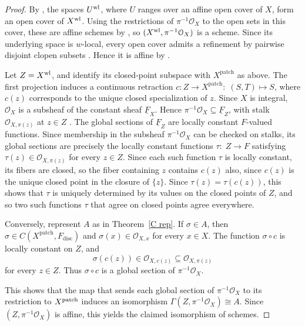 \documentclass[11pt]{amsart}
\def\O{{\mathcal{O}}}
\begin{document}
\begin{proof}
By \cite[Lemma~7.14]{ScholzeDiamonds}, the spaces $U^{\rm wl}$, where $U$ ranges over an affine open cover of $X$, form an open cover of $X^{\rm wl}$. Using the  restrictions of $\pi^{-1}\mathcal O_X$ to the open sets in this cover, these are affine schemes by \cite[Lemma~2.2.4]{BhattScholze}, so $(X^{\rm wl},\pi^{-1}\mathcal O_X)$ is a scheme. Since its underlying space is $w$-local,
every open cover admits a refinement by pairwise disjoint
clopen subsets \cite[Definition~2.1.1 and Lemma~2.1.4]{BhattScholze}. Hence it is affine by \cite[Theorem~4.1]{Schroer}.


Let $Z=X^{\rm wl}$, and identify its closed-point subspace with $X^{\mathrm{patch}}$ as above. The first projection induces a continuous retraction $c\colon Z\to X^{\mathrm{patch}}\colon \;(S,T)\longmapsto S$,
where $c(z)$ corresponds to the unique closed specialization of $z$.
Since $X$ is integral, $\mathcal O_X$ is a subsheaf of the constant sheaf $\underline F_X$. Hence $\pi^{-1}\mathcal O_X\subseteq\underline F_Z$, with stalk $\mathcal O_{X,\pi(z)}$ at $z\in Z$ \cite[Tag~008H]{stacks-project}. 
The global sections of $\underline F_Z$ are locally constant $F$-valued functions. Since membership in the subsheaf $\pi^{-1}\mathcal O_X$ can be checked on stalks, its global sections are precisely the locally constant functions $\tau\colon\; Z\to F$ satisfying
$\tau(z)\in\mathcal O_{X,\pi(z)}$ for every $z\in Z$. Since each such function $\tau$ is locally constant, its fibers are closed, so the fiber containing $z$ contains $c(z)$ also, since $c(z)$ is the unique closed point in the closure of $\{z\}$. Since $\tau(z) = \tau(c(z))$, this shows that $\tau$ is uniquely determined by its values on the closed points of $Z$, and so two such functions $\tau$ that agree on closed points agree everywhere. 

Conversely, represent $A$ as in Theorem~\ref{C rep}. If $\sigma\in A$, then $\sigma\in C(X^{\mathrm{patch}},F_{\mathrm{disc}})$ and $\sigma(x)\in\mathcal O_{X,x}$ for every $x\in X$. The function $\sigma\circ c$ is locally constant on $Z$, and
\[
\sigma(c(z))\in\mathcal O_{X,c(z)}
\subseteq\mathcal O_{X,\pi(z)}
\]
for every $z\in Z$.
Thus $\sigma\circ c$ is a global section of $\pi^{-1}\mathcal O_X$.

This shows that the map that sends each global section of $\pi^{-1}\O_X$ to its restriction to $X^{\rm patch}$ induces an isomorphism $\Gamma(Z,\pi^{-1}\mathcal O_X) \cong A.$ Since $(Z,\pi^{-1}\mathcal O_X)$ is affine, this yields the claimed isomorphism of schemes.
\end{proof}
\end{document}
